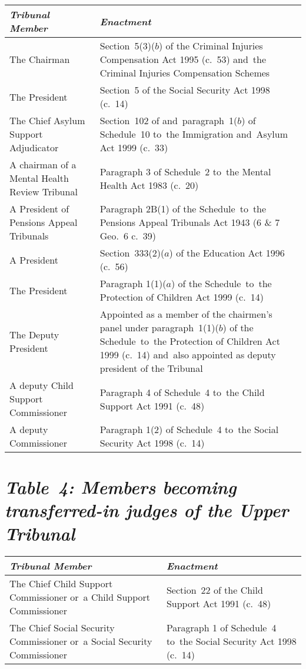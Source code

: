 \documentclass[12pt,a4paper]{article}
\begin{document}
{\noindent{}
\begin{longtable}{p{85.252pt}p{280.7461pt}}
\hline
\itshape Tribunal	Member & \itshape Enactment\\
\hline
\endhead
\hline
\endlastfoot
The Chairman	&Section~5(3)($b$)  of the Criminal Injuries Compensation Act 1995 (c.~53) and~the Criminal Injuries Compensation Schemes\\
The President	&Section~5 of the Social Security Act 1998 (c.~14)\\
The Chief Asylum Support Adjudicator	&Section~102 of and~paragraph~1($b$)  of Schedule~10 to~the Immigration and~Asylum Act 1999 (c.~33)\\
A chairman of a Mental Health Review Tribunal	&Paragraph 3 of Schedule~2 to~the Mental Health Act 1983 (c.~20)\\
A President of Pensions Appeal Tribunals	&Paragraph 2B(1) of the Schedule~to~the Pensions Appeal Tribunals Act 1943 (6 \& 7 Geo.~6 c.~39)\\
A President	&Section~333(2)($a$)  of the Education Act 1996 (c.~56)\\
The President	&Paragraph 1(1)($a$)  of the Schedule~to~the Protection of Children Act 1999 (c.~14)\\
The Deputy President	&Appointed as a member of the chairmen’s panel under paragraph~1(1)($b$)  of the Schedule~to~the Protection of Children Act 1999 (c.~14) and~also appointed as deputy president of the Tribunal\\
A deputy Child Support Commissioner	&Paragraph 4 of Schedule~4 to~the Child Support Act 1991 (c.~48)\\
A deputy Commissioner	&Paragraph 1(2) of Schedule~4 to~the Social Security Act 1998 (c.~14)\\
\end{longtable}

}


\section*{\itshape\sloppy Table~4: Members becoming transferred-in judges of the Upper Tribunal}

{\noindent
\begin{longtable}{p{196.03664pt}p{169.96071pt}}
\hline
\itshape Tribunal	Member & \itshape Enactment\\
\hline
\endhead
\hline
\endlastfoot
The Chief Child Support Commissioner or~a Child Support Commissioner	&Section~22 of the Child Support Act 1991 (c.~48)\\
The Chief Social Security Commissioner or~a Social Security Commissioner	&Paragraph 1 of Schedule~4 to~the Social Security Act 1998 (c.~14)\\
\end{longtable}

}
\end{document}
